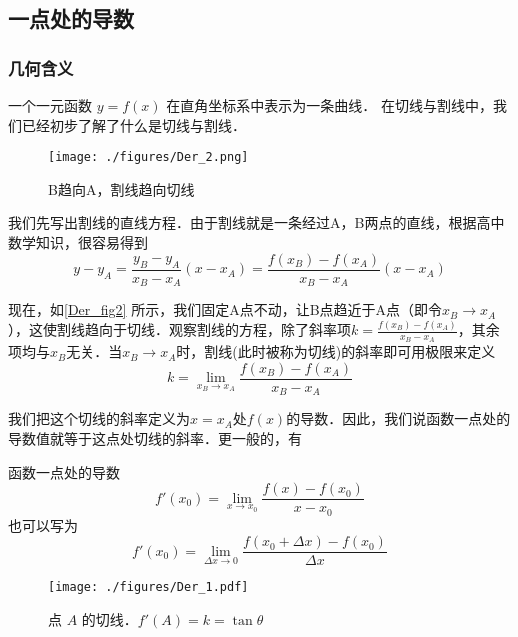 

\subsection{一点处的导数}
\subsubsection{几何含义}
一个一元函数 $y = f(x)$ 在直角坐标系中表示为一条曲线． 在切线与割线中，我们已经初步了解了什么是切线与割线．

\begin{figure}[ht]
\centering
\texttt{[image: ./figures/Der\_2.png]}
\caption{B趋向A，割线趋向切线} \label{Der_fig2}
\end{figure}

我们先写出割线的直线方程．由于割线就是一条经过A，B两点的直线，根据高中数学知识，很容易得到
\begin{equation}
y-y_A=\frac{y_B-y_A}{x_B-x_A}(x-x_A)=\frac{f(x_B)-f(x_A)}{x_B-x_A}(x-x_A)
\end{equation}

现在，如\autoref{Der_fig2} 所示，我们固定A点不动，让B点趋近于A点（即令$x_B\rightarrow x_A$），这使割线趋向于切线．观察割线的方程，除了斜率项$k=\frac{f(x_B)-f(x_A)}{x_B-x_A}$，其余项均与$x_B$无关．当$x_B\rightarrow x_A$时，割线(此时被称为切线)的斜率即可用极限来定义
\begin{equation}
k=\lim_{x_B\to x_A}\frac{f(x_B)-f(x_A)}{x_B-x_A}
\end{equation}

我们把这个切线的斜率定义为$x=x_A$处$f(x)$的导数．因此，我们说函数一点处的导数值就等于这点处切线的斜率．更一般的，有
\begin{definition}{函数一点处的导数}
\begin{equation}
f'(x_0)=\lim_{x\to x_0}\frac{f(x)-f(x_0)}{x-x_0}
\end{equation}
也可以写为
\begin{equation}
f'(x_0)=\lim_{\Delta x\to0}\frac{f(x_0+\Delta x)-f(x_0)}{\Delta x}
\end{equation}
\end{definition}

\begin{figure}[ht]
\centering
\texttt{[image: ./figures/Der\_1.pdf]}
\caption{点 $A$ 的切线．$f'(A)=k=\tan \theta$}
\end{figure}


